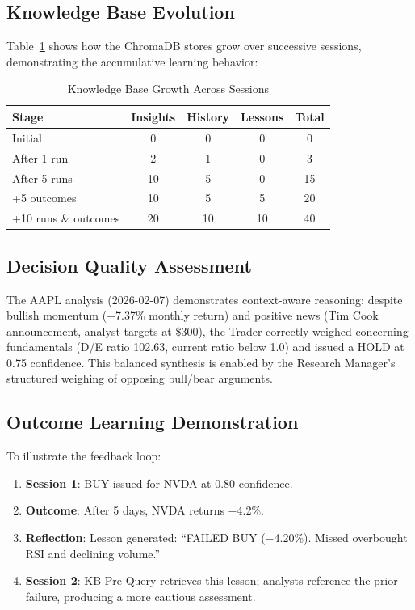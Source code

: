\documentclass[conference]{IEEEtran}
\begin{document}
\subsection{Knowledge Base Evolution}

Table~\ref{tab:kbgrowth} shows how the ChromaDB stores grow over successive sessions, demonstrating the accumulative learning behavior:

\begin{table}[htbp]
\caption{Knowledge Base Growth Across Sessions}
\label{tab:kbgrowth}
\centering
\begin{tabular}{@{}lcccc@{}}
\toprule
\textbf{Stage} & \textbf{Insights} & \textbf{History} & \textbf{Lessons} & \textbf{Total} \\
\midrule
Initial & 0 & 0 & 0 & 0 \\
After 1 run & 2 & 1 & 0 & 3 \\
After 5 runs & 10 & 5 & 0 & 15 \\
+5 outcomes & 10 & 5 & 5 & 20 \\
+10 runs \& outcomes & 20 & 10 & 10 & 40 \\
\bottomrule
\end{tabular}
\end{table}

\subsection{Decision Quality Assessment}

The AAPL analysis (2026-02-07) demonstrates context-aware reasoning: despite bullish momentum (+7.37\% monthly return) and positive news (Tim Cook announcement, analyst targets at \$300), the Trader correctly weighed concerning fundamentals (D/E ratio 102.63, current ratio below 1.0) and issued a HOLD at 0.75 confidence. This balanced synthesis is enabled by the Research Manager's structured weighing of opposing bull/bear arguments.

\subsection{Outcome Learning Demonstration}

To illustrate the feedback loop:
\begin{enumerate}
\item \textbf{Session 1}: BUY issued for NVDA at 0.80 confidence.
\item \textbf{Outcome}: After 5 days, NVDA returns $-$4.2\%.
\item \textbf{Reflection}: Lesson generated: ``FAILED BUY ($-$4.20\%). Missed overbought RSI and declining volume.''
\item \textbf{Session 2}: KB Pre-Query retrieves this lesson; analysts reference the prior failure, producing a more cautious assessment.
\end{enumerate}
\end{document}
